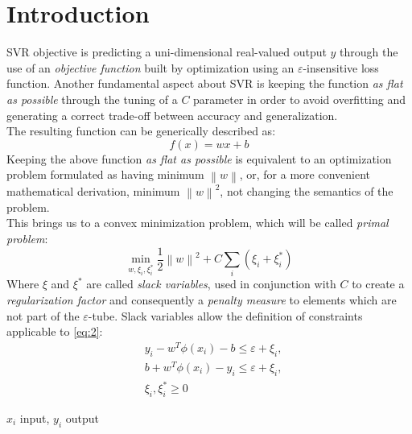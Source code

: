 \documentclass[12pt]{article}
\newcommand{\norm}[1]{\left\lVert#1\right\rVert}
\begin{document}
	\section{Introduction}
	SVR objective is predicting a uni-dimensional real-valued output $y$ through the use of an \textit{objective function} built by optimization using an $\varepsilon$-insensitive loss function. Another fundamental aspect about SVR is keeping the function \textit{as flat as possible} through the tuning of a $C$ parameter in order to avoid overfitting and generating a correct trade-off between accuracy and generalization.\\
	The resulting function can be generically described as:
		\begin{equation}\label{eq:1}
			f(x) = w  x + b
		\end{equation}
	Keeping the above function \textit{as flat as possible} is equivalent to an optimization problem formulated as having minimum $\norm{w}$, or, for a more convenient mathematical derivation, minimum $\norm{w}^2$, not changing the semantics of the problem.\\
	This brings us to a convex minimization problem, which will be called \textit{primal problem}:
\begin{equation}\label{eq:2}
		\min_{w,\xi_i,\xi_i^*} \frac{1}{2}\norm{w}^2+C\sum_{i}(\xi_{i} + \xi_{i}^*)
	\end{equation}
	Where $\xi$ and $\xi^*$ are called \textit{slack variables}, used in conjunction with $C$ to create a \textit{regularization factor} and consequently a \textit{penalty measure} to elements which are not part of the $\varepsilon$-tube. Slack variables allow the definition of constraints applicable to \eqref{eq:2}:
	\begin{subequations}
	\begin{align}
		&y_i - w^T\phi(x_i) - b \leq \varepsilon + \xi_i,  \label{eq:3a}\\ 
		&b + w^T\phi(x_i) - y_i \leq \varepsilon + \xi_i, \label{eq:3b}\\
		&\xi_i,\xi_i^*  \geq 0 \label{eq:3c}
	\end{align}
	\end{subequations}
	\begin{center}
		\footnotesize{$x_i$ input, $y_i$ output}
	\end{center}
	\pagebreak
\end{document}
